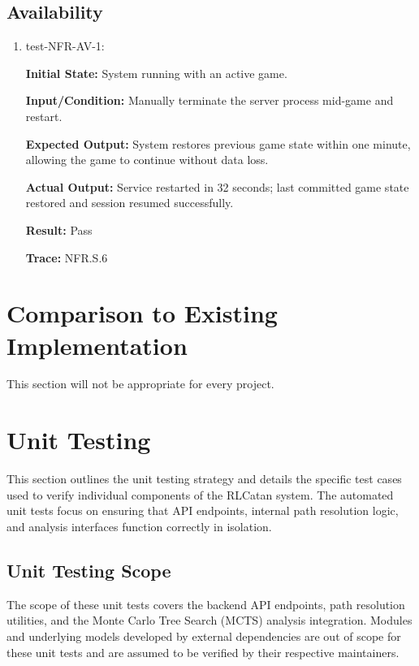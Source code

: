 \documentclass[12pt, titlepage]{article}
\begin{document}
\subsection{Availability}

\begin{enumerate}
\item test-NFR-AV-1:

\textbf{Initial State:} System running with an active game.

\textbf{Input/Condition:} Manually terminate the server process mid-game and restart.

\textbf{Expected Output:} System restores previous game state within one minute, allowing the game to continue without data loss.

\textbf{Actual Output:} Service restarted in 32 seconds; last committed game state restored and session resumed successfully.

\textbf{Result:} Pass

\textbf{Trace:} NFR.S.6
\end{enumerate}

	
\section{Comparison to Existing Implementation}	

This section will not be appropriate for every project.

\section{Unit Testing}

This section outlines the unit testing strategy and details the specific test cases used to verify individual components of the RLCatan system.
The automated unit tests focus on ensuring that API endpoints, internal path resolution logic, and analysis interfaces function correctly in isolation.

\subsection{Unit Testing Scope}

The scope of these unit tests covers the backend API endpoints, path resolution utilities, and the Monte Carlo Tree Search (MCTS) analysis integration.
Modules and underlying models developed by external dependencies are out of scope for these unit tests and are assumed to be verified by their respective maintainers.
\end{document}
